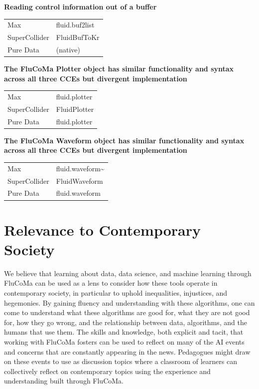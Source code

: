 \documentclass{article}
\begin{document}
\textbf{Reading control information out of a buffer}

\begin{longtable}{ll}
\toprule
Max & fluid.buf2list \\
SuperCollider & FluidBufToKr \\
Pure Data & (native) \\
\bottomrule
\end{longtable}

\textbf{The FluCoMa Plotter object has similar functionality and syntax
across all three CCEs but divergent implementation}

\begin{longtable}{ll}
\toprule
Max & fluid.plotter \\
SuperCollider & FluidPlotter \\
Pure Data & fluid.plotter \\
\bottomrule
\end{longtable}

\textbf{The FluCoMa Waveform object has similar functionality and syntax
across all three CCEs but divergent implementation}

\begin{longtable}{ll}
\toprule
Max & fluid.waveform\textasciitilde{} \\
SuperCollider & FluidWaveform \\
Pure Data & fluid.waveform \\
\bottomrule
\end{longtable}

\section{Relevance to Contemporary
Society}\label{relevance-to-contemporary-society}

We believe that learning about data, data science, and machine learning
through FluCoMa can be used as a lens to consider how these tools
operate in contemporary society, in particular to uphold inequalities,
injustices, and hegemonies. By gaining fluency and understanding with
these algorithms, one can come to understand what these algorithms are
good for, what they are not good for, how they go wrong, and the
relationship between data, algorithms, and the humans that use them. The
skills and knowledge, both explicit and tacit, that working with FluCoMa
fosters can be used to reflect on many of the AI events and concerns
that are constantly appearing in the news. Pedagogues might draw on
these events to use as discussion topics where a classroom of learners
can collectively reflect on contemporary topics using the experience and
understanding built through FluCoMa.
\end{document}

